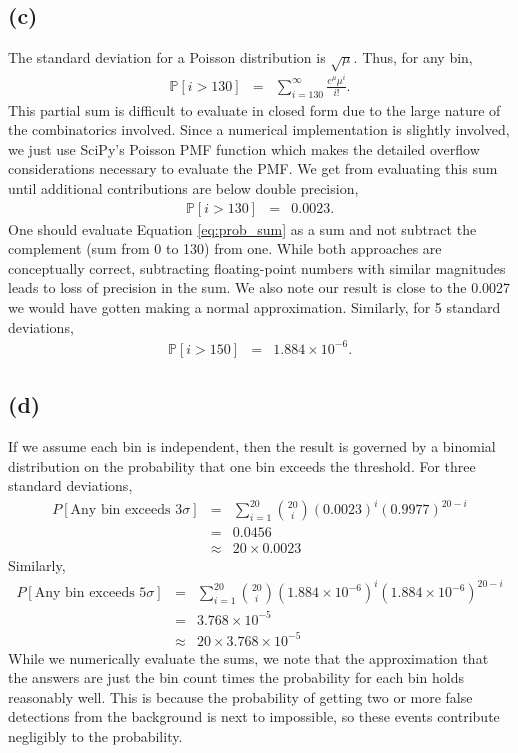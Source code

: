 \documentclass[12pt]{article}
\begin{document}
\subsection*{(c)}
The standard deviation for a Poisson distribution is $\sqrt{\mu}$.  Thus, for any bin,
\begin{eqnarray}\label{eq:prob_sum}
\mathbb{P}[i > 130] &=& \sum_{i = 130}^{\infty} \frac{e^{\mu} \mu^{i}}{i !}.
\end{eqnarray}
This partial sum is difficult to evaluate in closed form due to the large nature of the combinatorics involved. Since a numerical implementation is slightly involved, we just use SciPy's Poisson PMF function which makes the detailed overflow considerations necessary to evaluate the PMF.  We get from evaluating this sum until additional contributions are below double precision,  
\begin{eqnarray}
\mathbb{P}[i > 130] &=& 0.0023.
\end{eqnarray}
One should evaluate Equation \eqref{eq:prob_sum} as a sum and not subtract the complement (sum from 0 to 130) from one.  While both approaches are conceptually correct, subtracting floating-point numbers with similar magnitudes leads to loss of precision in the sum. We also note our result is close to the 0.0027 we would have gotten making a normal approximation. Similarly, for 5 standard deviations,
\begin{eqnarray}
\mathbb{P}[i > 150] &=& 1.884 \times 10^{-6}.
\end{eqnarray}
\subsection*{(d)}
If we assume each bin is independent, then the result is governed by a binomial distribution on the probability that one bin exceeds the threshold.  For three standard deviations,
\begin{eqnarray}
P[\text{Any bin exceeds } 3 \sigma] &=& \sum_{i = 1}^{20} \binom{20}{i} (0.0023)^{i} (0.9977)^{20 - i}\\
&=& 0.0456\\
&\approx & 20 \times 0.0023
\end{eqnarray}
Similarly,
\begin{eqnarray}
P[\text{Any bin exceeds } 5 \sigma] &=& \sum_{i = 1}^{20} \binom{20}{i} (1.884 \times 10^{-6})^{i} (1.884 \times 10^{-6})^{20 - i}\\
&=& 3.768 \times 10^{-5}\\
&\approx& 20 \times 3.768 \times 10^{-5}
\end{eqnarray}
While we numerically evaluate the sums, we note that the approximation that the answers are just the bin count times the probability for each bin holds reasonably well.  This is because the probability of getting two or more false detections from the background is next to impossible, so these events contribute negligibly to the probability.
\end{document}
